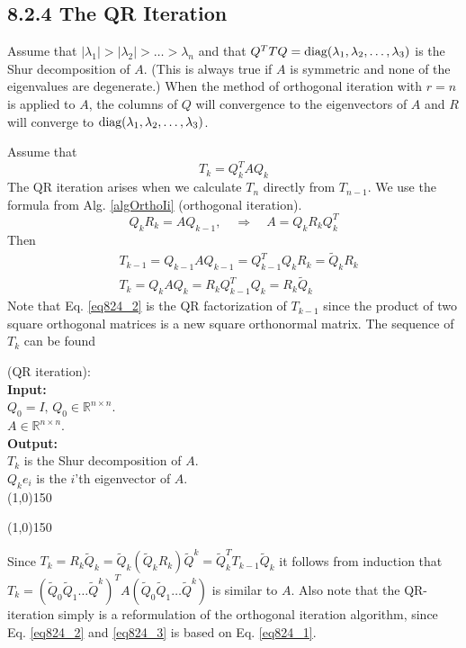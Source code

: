 
\subsection*{8.2.4 The QR Iteration}%

Assume that $|\lambda_1|>|\lambda_2|>\dots>\lambda_n$ and that 
$Q^TTQ=\text{diag}{(}\lambda_1,\lambda_2,\dots,\lambda_3)$ is the Shur decomposition of $A$.
(This is always true if $A$ is symmetric and none of the eigenvalues are degenerate.)
When the method of orthogonal iteration with $r=n$ is applied to $A$, the columns of $Q$ 
will convergence to the eigenvectors of $A$ and $R$ will converge to 
$\text{diag}{(}\lambda_1,\lambda_2,\dots,\lambda_3)$.

Assume that 
\begin{equation}
	T_k = Q_k^T A Q_k
\end{equation}
The QR iteration arises when we calculate $T_n$ directly from $T_{n-1}$. 
%
We use the formula from  Alg. \ref{algOrthoIi} (orthogonal iteration).
\begin{equation}
	Q_kR_k = AQ_{k-1},\quad \Rightarrow \quad A = 	Q_kR_kQ_k^T \label{eq824_1} 
\end{equation}
Then
\begin{align}
	&T_{k-1} = Q_{k-1} A Q_{k-1}  = Q_{k-1}^T Q_{k} R_{k} = \tilde Q_k R_k\label{eq824_2} \\
	&T_k = Q_k A Q_{k}  = R_k Q_{k-1}^T Q_{k} = R_k \tilde Q_k 	\label{eq824_3} 
\end{align}
Note that Eq. \eqref{eq824_2} is the QR factorization of $T_{k-1}$ since the product of two
square orthogonal matrices is a new square orthonormal matrix. 
The sequence of $T_k$ can be found
%
%
\begin{algo}
{
%
	(QR iteration):
%
}\\
\textbf{Input: }
{
%
	\\$Q_0=I,\,Q_0\in\mathbb R^{n\times n}$.
	\\$A\in\mathbb R^{n\times n}$.
%
}\\
\textbf{Output: }
{
%
	\\$T_k$ is the Shur decomposition of $A$. 
	\\$Q_ke_i$ is the $i$'th eigenvector of $A$.
%
}\\
\line(1,0){150}
\begin{algorithmic}
%
\EndFor{}
%
\end{algorithmic}
\line(1,0){150}
\label{algQRIterSimple}
\end{algo}
%
%
Since $T_k = R_k\tilde Q_k =\tilde Q_k(\tilde Q_k R_k)\tilde Q^k = \tilde Q^T_kT_{k-1}\tilde Q_k$
it follows from induction that 
$T_k = (\tilde Q_0\tilde Q_1\dots \tilde Q^k)^T A (\tilde Q_0\tilde Q_1\dots \tilde Q^k)$ is
similar to $A$.
Also note that the QR-iteration simply is a reformulation of
the orthogonal iteration algorithm, since Eq. \eqref{eq824_2} and \eqref{eq824_3} is based on
Eq. \eqref{eq824_1}.

